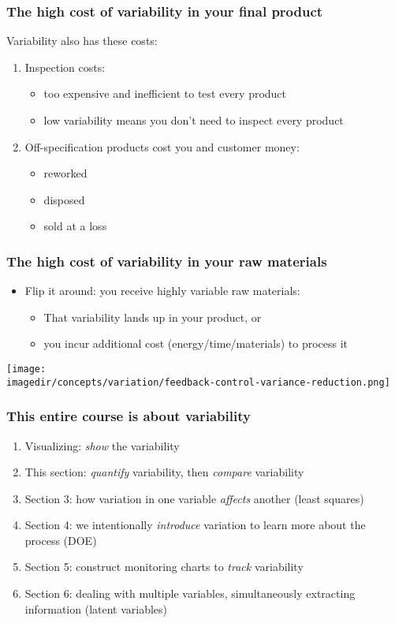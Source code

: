 \begin{frame}\frametitle{The high cost of variability in your final product}
	Variability also has these costs:
	
	\vspace{12pt}
	\begin{enumerate}
		\item	Inspection costs:
		\begin{itemize}
			\item	too expensive and inefficient to test every product
			\item	low variability means you don't need to inspect every product
		\end{itemize}
		\item	Off-specification products cost you and customer money:
		\begin{itemize}
			\item	reworked
			\item	disposed
			\item	sold at a loss
		\end{itemize}
	\end{enumerate}
\end{frame}

\begin{frame}\frametitle{The high cost of variability in your raw materials}
	\begin{itemize}
		\item	Flip it around: you receive highly variable raw materials:
		\begin{itemize}
			\item	That variability lands up in your product, or
			\item	you incur additional cost (energy/time/materials) to process it
		\end{itemize}
	\end{itemize}
	\begin{center}
		\texttt{[image: \\imagedir/concepts/variation/feedback-control-variance-reduction.png]}
	\end{center}
\end{frame}

\begin{frame}\frametitle{This entire course is about variability}
	\begin{enumerate}
		\item	Visualizing: \emph{show} the variability
		\item	This section: \emph{quantify} variability, then \emph{compare} variability
		\item	Section 3: how variation in one variable \emph{affects} another (least squares)
		\item	Section 4: we intentionally \emph{introduce} variation to learn more about the process (DOE)
		\item	Section 5: construct monitoring charts to \emph{track} variability
		\item	Section 6: dealing with multiple variables, simultaneously extracting information (latent variables)
	\end{enumerate}
\end{frame}

